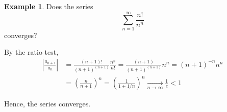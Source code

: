 \documentclass[12pt,a4paper]{article}
\theoremstyle{definition}
\newtheorem{example}{Example}[section]
\begin{document}
\begin{example}
	Does the series \[ \sum_{n=1}^\infty \frac{n!}{n^n} \] converges?
	
	By the ratio test,
	\begin{equation*}
		\begin{aligned}
			\left| \frac{a_{n+1}}{a_n} \right| &= \frac{(n+1)!}{(n+1)^{(n+1)}} \frac{n^n}{n!} = \frac{(n+1)}{(n+1)^{(n+1)}} n^n = (n+1)^{-n} n^n \\
			&= \left( \frac{n}{n+1} \right)^n = \left( \frac{1}{1+1/n} \right)^n \underset{n \to \infty}{\longrightarrow} \frac{1}{e} < 1
		\end{aligned}
	\end{equation*}
	
	Hence, the series converges.
\end{example}
\end{document}
